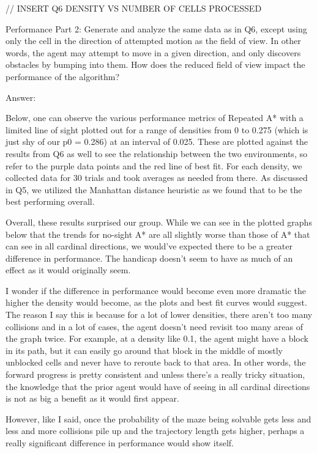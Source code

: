 \documentclass{homeworg}
\begin{document}
// INSERT Q6 DENSITY VS NUMBER OF CELLS PROCESSED

\newpage
\exercise*
Performance Part 2: Generate and analyze the same data as in Q6, except using only the cell in the direction of attempted motion as the field of view. In other words, the agent may attempt to move in a given direction, and only discovers obstacles by bumping into them. How does the reduced field of view impact the performance of the algorithm?

Answer:

Below, one can observe the various performance metrics of Repeated A* with a limited line of sight plotted out for a range of densities from 0 to 0.275 (which is just shy of our p0 = 0.286) at an interval of 0.025. These are plotted against the results from Q6 as well to see the relationship between the two environments, so refer to the purple data points and the red line of best fit. For each density, we collected data for 30 trials and took averages as needed from there. As discussed in Q5, we utilized the Manhattan distance heuristic as we found that to be the best performing overall.

Overall, these results surprised our group. While we can see in the plotted graphs below that the trends for no-sight A* are all slightly worse than those of A* that can see in all cardinal directions, we would've expected there to be a greater difference in performance. The handicap doesn't seem to have as much of an effect as it would originally seem.

I wonder if the difference in performance would become even more dramatic the higher the density would become, as the plots and best fit curves would suggest. The reason I say this is because for a lot of lower densities, there aren't too many collisions and in a lot of cases, the agent doesn't need revisit too many areas of the graph twice. For example, at a density like 0.1, the agent might have a block in its path, but it can easily go around that block in the middle of mostly unblocked cells and never have to reroute back to that area. In other words, the forward progress is pretty consistent and unless there's a really tricky situation, the knowledge that the prior agent would have of seeing in all cardinal directions is not as big a benefit as it would first appear. 

However, like I said, once the probability of the maze being solvable gets less and less and more collisions pile up and the trajectory length gets higher, perhaps a really significant difference in performance would show itself.
\end{document}
